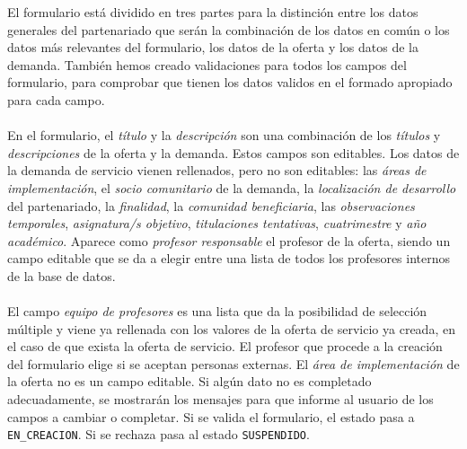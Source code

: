 \documentclass[11pt]{book}
\begin{document}
 El formulario está dividido en tres partes para la distinción entre los datos generales del partenariado que serán la combinación de los datos en común o los datos más relevantes del formulario, los datos de la oferta y los datos de la demanda. También hemos creado validaciones para todos los campos del formulario, para comprobar que tienen los datos validos en el formado apropiado para cada campo.\\\\
 En el formulario, el \emph{título} y la \emph{descripción } son una combinación de los \emph{títulos} y \emph{descripciones} de la oferta y la demanda. Estos campos son editables. Los datos de la demanda de servicio vienen rellenados, pero no son editables:  las \emph{áreas de implementación}, el \emph{socio comunitario} de la demanda, la \emph{localización de desarrollo} del partenariado, la \emph{finalidad}, la \emph{comunidad beneficiaria}, las \emph{observaciones temporales}, \emph{asignatura/s objetivo}, \emph{titulaciones tentativas}, \emph{cuatrimestre} y \emph{año académico}. Aparece como \emph{profesor responsable} el profesor de la oferta, siendo un campo editable que se da a elegir entre una lista de todos los profesores internos de la base de datos.\\\\
 El campo \emph{equipo de profesores} es una lista que da la posibilidad de selección múltiple y viene ya rellenada con los valores de la oferta de servicio ya creada, en el caso de que exista la oferta de servicio. El profesor que procede a la creación del formulario elige si se aceptan personas externas. El \emph{área de implementación} de la oferta no es un campo editable. Si algún dato no es completado adecuadamente, se mostrarán los mensajes para que informe al usuario de los campos a cambiar o completar. Si se valida el formulario, el estado pasa a \texttt{EN\_CREACION}. Si se rechaza pasa al estado \texttt{SUSPENDIDO}.
 \\\\
 
\end{document}
